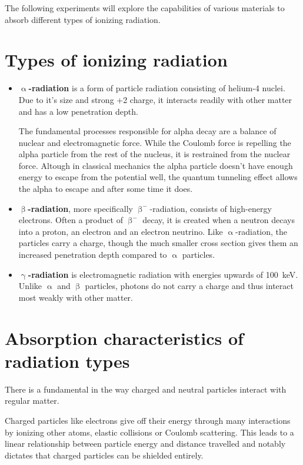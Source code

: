 
The following experiments will explore the capabilities of various materials to absorb different types of ionizing radiation.

\section{Types of ionizing radiation}
\begin{itemize}
	\item \textbf{$\upalpha$-radiation} is a form of particle radiation consisting of helium-4 nuclei.
	Due to it's size and strong +2 charge, it interacts readily with other matter and has a low penetration depth.
	
	The fundamental processes responsible for alpha decay are a balance of nuclear and electromagnetic force.
	While the Coulomb force is repelling the alpha particle from the rest of the nucleus, it is restrained from the nuclear force.
	Altough in classical mechanics the alpha particle doesn't have enough energy to escape from the potential well, the quantum tunneling effect allows the alpha to escape and after some time it does.
	\item \textbf{$\upbeta$-radiation}, more specifically $\upbeta^{-}$-radiation, consists of high-energy electrons.
	Often a product of $\upbeta^{-}$ decay, it is created when a neutron decays into a proton, an electron and an electron neutrino.
	Like $\upalpha$-radiation, the particles carry a charge, though the much smaller cross section gives them an increased penetration depth compared to $\upalpha$ particles.
	\item \textbf{$\upgamma$-radiation} is electromagnetic radiation with energies upwards of \SI{100}{\kilo\electronvolt}.
	Unlike $\upalpha$ and $\upbeta$ particles, photons do not carry a charge and thus interact most weakly with other matter.
\end{itemize}

\section{Absorption characteristics of radiation types}
There is a fundamental in the way charged and neutral particles interact with regular matter.

Charged particles like electrons give off their energy through many interactions by ionizing other atoms, elastic collisions or Coulomb scattering.
This leads to a linear relationship between particle energy and distance travelled and notably dictates that charged particles can be shielded entirely.

